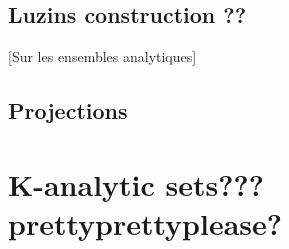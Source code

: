 \documentclass[10pt, a4paper, titlepage]{article}
\numberwithin{equation}{section}
\begin{document}
\subsection{Luzins construction ??}
[Sur les ensembles analytiques]




 \subsection{Projections}



\section{K-analytic sets??? prettyprettyplease?}































\vspace{\fill}
\printbibliography{}
\end{document}
